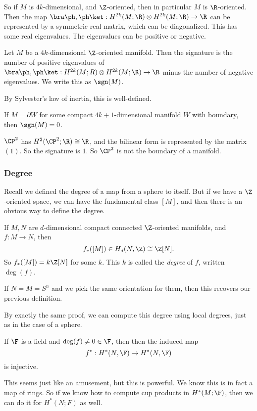 \documentclass[a4paper]{article}
\begin{document}
So if $M$ is $4k$-dimensional, and $\Z$-oriented, then in particular $M$ is $\R$-oriented. Then the map $\bra \ph, \ph\ket : H^{2k}(M; \R) \otimes H^{2k}(M; \R) \to \R$ can be represented by a symmetric real matrix, which can be diagonalized. This has some real eigenvalues. The eigenvalues can be positive or negative.
\begin{defi}
  Let $M$ be a $4k$-dimensional $\Z$-oriented manifold. Then the signature is the number of positive eigenvalues of $\bra \ph, \ph\ket: H^{2k}(M; R) \otimes H^{2k}(M; \R) \to \R$ minus the number of negative eigenvalues. We write this as $\sgn(M)$.
\end{defi}
By Sylvester's law of inertia, this is well-defined.

\begin{fact}
  If $M = \partial W$ for some compact $4k + 1$-dimensional manifold $W$ with boundary, then $\sgn(M) = 0$.
\end{fact}

\begin{eg}
  $\CP^2$ has $H^2(\CP^2; \R) \cong \R$, and the bilinear form is represented by the matrix $(1)$. So the signature is $1$. So $\CP^2$ is not the boundary of a manifold.
\end{eg}

\subsubsection*{Degree}
Recall we defined the degree of a map from a sphere to itself. But if we have a $\Z$-oriented space, we can have the fundamental class $[M]$, and then there is an obvious way to define the degree.

\begin{defi}
  If $M, N$ are $d$-dimensional compact connected $\Z$-oriented manifolds, and $f: M \to N$, then
  \[
    f_*([M]) \in H_d(N, \Z) \cong \Z[N].
  \]
  So $f_*([M]) = k \Z[N]$ for some $k$. This $k$ is called the \emph{degree} of $f$, written $\deg (f)$.
\end{defi}

If $N = M = S^n$ and we pick the same orientation for them, then this recovers our previous definition.

By exactly the same proof, we can compute this degree using local degrees, just as in the case of a sphere.

\begin{cor}
  If $\F$ is a field and $\deg(f) \not= 0 \in \F$, then then the induced map
  \[
    f^*: H^*(N, \F) \to H^*(N, \F)
  \]
  is injective.
\end{cor}
This seems just like an amusement, but this is powerful. We know this is in fact a map of rings. So if we know how to compute cup products in $H^*(M; \F)$, then we can do it for $H^*(N; F)$ as well.
\end{document}
